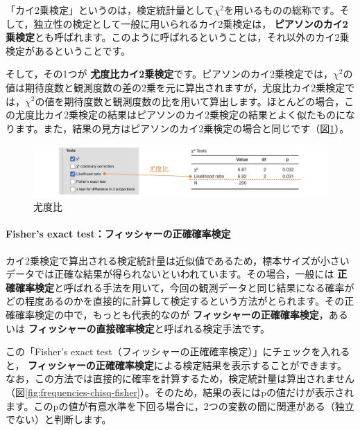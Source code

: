 \documentclass[
  12pt,
  a5jpaper,
  lualatex, ja=standard]{bxjsbook}
\renewcommand{\emph}[1]{\textbf{\color{emph} #1}}
\begin{document}
「カイ2乗検定」というのは，検定統計量として\(\chi^2\)を用いるものの総称です。そして，独立性の検定として一般に用いられるカイ2乗検定は，\emph{ピアソンのカイ2乗検定}とも呼ばれます。このように呼ばれるということは，それ以外のカイ2乗検定があるということです。

そして，その1つが\emph{尤度比カイ2乗検定}です。ピアソンのカイ2乗検定では，\(\chi^2\)の値は期待度数と観測度数の差の2乗を元に算出されますが，尤度比カイ2乗検定では，\(\chi^2\)の値を期待度数と観測度数の比を用いて算出します。ほとんどの場合，この尤度比カイ2乗検定の結果はピアソンのカイ2乗検定の結果とよく似たものになります。また，結果の見方はピアソンのカイ2乗検定の場合と同じです（図\ref{fig:frequencies-chisq-lr}）。

\begin{figure}[!ht]

{\centering \includegraphics[width=1\linewidth]{images/frequencies/chisq-lr} 

}

\caption{尤度比}\label{fig:frequencies-chisq-lr}
\end{figure}

\hypertarget{fishers-exact-testux30d5ux30a3ux30c3ux30b7ux30e3ux30fcux306eux6b63ux78baux78baux7387ux691cux5b9a}{%
\paragraph*{Fisher's exact test：フィッシャーの正確確率検定}\label{fishers-exact-testux30d5ux30a3ux30c3ux30b7ux30e3ux30fcux306eux6b63ux78baux78baux7387ux691cux5b9a}}

カイ2乗検定で算出される検定統計量は近似値であるため，標本サイズが小さいデータでは正確な結果が得られないといわれています。その場合，一般には\emph{正確確率検定}と呼ばれる手法を用いて，今回の観測データと同じ結果になる確率がどの程度あるのかを直接的に計算して検定するという方法がとられます。その正確確率検定の中で，もっとも代表的なのが\emph{フィッシャーの正確確率検定}，あるいは\emph{フィッシャーの直接確率検定}と呼ばれる検定手法です。

この「Fisher's exact test（フィッシャーの正確確率検定）」にチェックを入れると，\emph{フィッシャーの正確確率検定}による検定結果を表示することができます。なお，この方法では直接的に確率を計算するため，検定統計量は算出されません（図\ref{fig:frequencies-chisq-fisher}）。そのため，結果の表にはpの値だけが表示されます。このpの値が有意水準を下回る場合に，2つの変数の間に関連がある（独立でない）と判断します。
\end{document}
